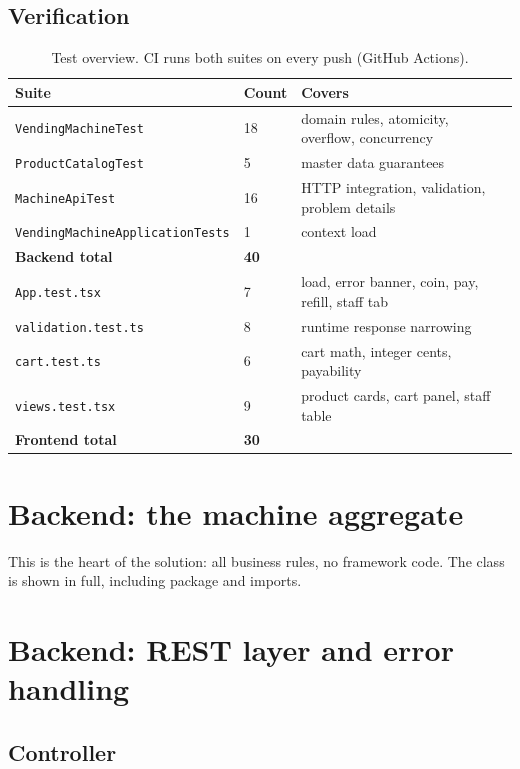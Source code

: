 \documentclass[11pt,a4paper]{article}
\newcommand{\code}[1]{\texttt{\small #1}}
\begin{document}
\subsection{Verification}

\begin{table}[h]
\centering
\small
\begin{tabular}{@{}lll@{}}
\toprule
\textbf{Suite} & \textbf{Count} & \textbf{Covers} \\
\midrule
\code{VendingMachineTest} & 18 & domain rules, atomicity, overflow, concurrency \\
\code{ProductCatalogTest} & 5 & master data guarantees \\
\code{MachineApiTest} & 16 & HTTP integration, validation, problem details \\
\code{VendingMachineApplicationTests} & 1 & context load \\
\textbf{Backend total} & \textbf{40} & \\
\midrule
\code{App.test.tsx} & 7 & load, error banner, coin, pay, refill, staff tab \\
\code{validation.test.ts} & 8 & runtime response narrowing \\
\code{cart.test.ts} & 6 & cart math, integer cents, payability \\
\code{views.test.tsx} & 9 & product cards, cart panel, staff table \\
\textbf{Frontend total} & \textbf{30} & \\
\bottomrule
\end{tabular}
\caption{Test overview. CI runs both suites on every push (GitHub Actions).}
\end{table}

\newpage
\section{Backend: the machine aggregate}

This is the heart of the solution: all business rules, no framework code.
The class is shown in full, including package and imports.



\newpage
\section{Backend: REST layer and error handling}

\subsection{Controller}
\end{document}
